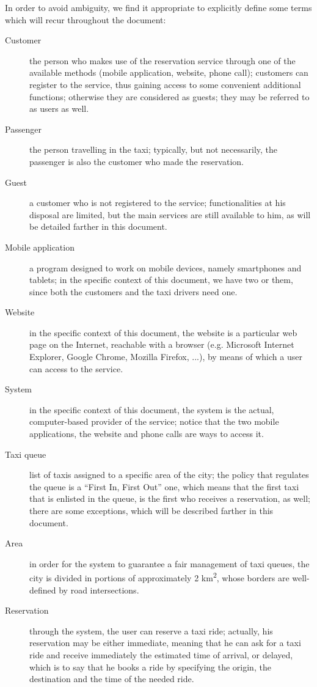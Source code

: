 In order to avoid ambiguity, we find it appropriate to explicitly define some terms which will recur throughout the document:

\begin{description}
	\item [Customer] the person who makes use of the reservation service through one of the available methods (mobile application, website, phone call); customers can register to the service, thus gaining access to some convenient additional functions; otherwise they are considered as guests; they may be referred to as users as well. 
	\item [Passenger] the person travelling in the taxi; typically, but not necessarily, the passenger is also the customer who made the reservation.
	\item [Guest] a customer who is not registered to the service; functionalities at his disposal are limited, but the main services are still available to him, as will be detailed farther in this document.
	\item [Mobile application] a program designed to work on mobile devices, namely smartphones and tablets; in the specific context of this document, we have two or them, since both the customers and the taxi drivers need one.
	\item [Website] in the specific context of this document, the website is a particular web page on the Internet, reachable with a browser (e.g. Microsoft Internet Explorer, Google Chrome, Mozilla Firefox, ...), by means of which a user can access to the service.
	\item [System] in the specific context of this document, the system is the actual, computer-based provider of the service; notice that the two mobile applications, the website and phone calls are ways to access it.  
	\item [Taxi queue] list of taxis assigned to a specific area of the city; the policy that regulates the queue is a ``First In, First Out'' one, which means that the first taxi that is enlisted in the queue, is the first who receives a reservation, as well; there are some exceptions, which will be described farther in this document.
	\item [Area] in order for the system to guarantee a fair management of taxi queues, the city is divided in portions of approximately 2 km\textsuperscript{2}, whose borders are well-defined by road intersections.
	\item [Reservation] through the system, the user can reserve a taxi ride; actually, his reservation may be either immediate, meaning that he can ask for a taxi ride and receive immediately the estimated time of arrival, or delayed, which is to say that he books a ride by specifying the origin, the destination and the time of the needed ride.
\end{description}





